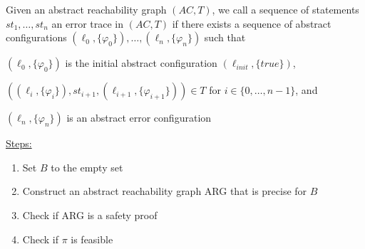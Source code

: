 \documentclass[landscape, a4paper]{article}
\begin{document}
\begin{minipage}[t]{0.2\linewidth}
	\begin{betterlist}
		\item \color{orange}Given an abstract reachability graph $(AC, T)$, we call a sequence of statements $st_1,\ldots , st_n$ an \alert{error trace in $(AC, T)$} if there exists a sequence of abstract configurations $(\ell_0, \{ \varphi_0\} ),\ldots , (\ell_n, \{ \varphi_n\})$ such that
		\begin{betterlist}
			\item $(\ell_0, \{ \varphi_0\} )$ is the initial abstract configuration $(\ell_{init}, \{ true\} )$,
			\item $( (\ell_i, \{ \varphi_i\} ), st_{i+1}, (\ell_{i+1}, \{ \varphi_{i+1}\} ) ) \in T$ for $i \in \{ 0,\ldots , n −1\}$, and
			\item $(\ell_n, \{ \varphi_n\} )$ is an abstract error configuration
		\end{betterlist}\color{black}
		\item \underline{Steps:}
		\begin{enumerate}
			\item Set $B$ to the empty set
			\item Construct an abstract reachability graph ARG that is precise for $B$
			\item Check if ARG is a safety proof
			\item Check if $\pi$ is feasible
		\end{enumerate}


\end{betterlist}
\end{minipage}
\end{document}
